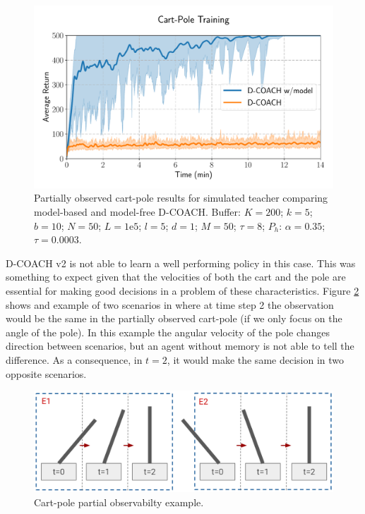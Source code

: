 \begin{figure}[h]
    \centering
    \includegraphics[width=0.9\linewidth]{imagenes/cap3/cartpole_LD_model.pdf}
    \caption{Partially observed cart-pole results for simulated teacher comparing model-based and model-free D-COACH.  Buffer: $K = 200$; $k=5$; $b = 10$; $N = 50$; $L=1\mathrm{e}5$; $l=5$; $d=1$; $M=50$; $\tau=8$; $P_{h}$: $\alpha = 0.35$; $\tau = 0.0003$.}
    \label{fig:ld_cartpole_model}
\end{figure}

D-COACH v2 is not able to learn a well performing policy in this case. This was something to expect given that the velocities of both the cart and the pole are essential for making good decisions in a problem of these characteristics. Figure \ref{fig:cp_ex} shows and example of two scenarios in where at time step 2 the observation would be the same in the partially observed cart-pole (if we only focus on the angle of the pole). In this example the angular velocity of the pole changes direction between scenarios, but an agent without memory is not able to tell the difference. As a consequence, in $t=2$, it would make the same decision in two opposite scenarios.

\begin{figure}[h]
    \centering
    \includegraphics[width=0.9\linewidth]{imagenes/cap4/cartpole_ex.png}
    \caption{Cart-pole partial observabilty example.}
    \label{fig:cp_ex}
\end{figure}


